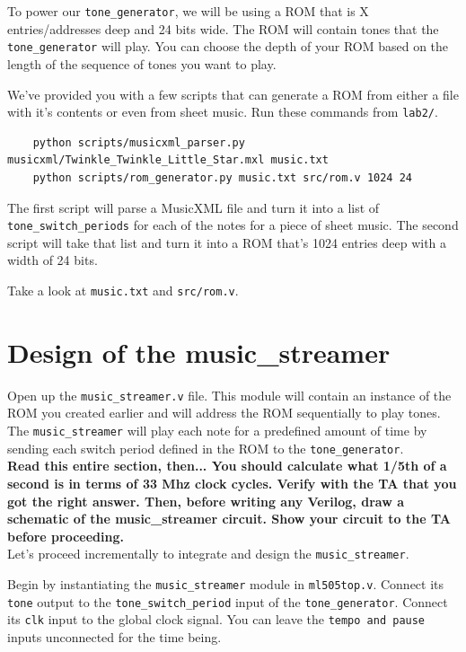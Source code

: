 \documentclass[11pt]{article}
\begin{document}
To power our \verb|tone_generator|, we will be using a ROM that is X entries/addresses deep and 24 bits wide. The ROM will contain tones that the \verb|tone_generator| will play. You can choose the depth of your ROM based on the length of the sequence of tones you want to play.

We've provided you with a few scripts that can generate a ROM from either a file with it's contents or even from sheet music. Run these commands from \verb|lab2/|.

\begin{verbatim}
	python scripts/musicxml_parser.py musicxml/Twinkle_Twinkle_Little_Star.mxl music.txt
	python scripts/rom_generator.py music.txt src/rom.v 1024 24
\end{verbatim}

The first script will parse a MusicXML file and turn it into a list of \verb|tone_switch_periods| for each of the notes for a piece of sheet music. The second script will take that list and turn it into a ROM that's 1024 entries deep with a width of 24 bits.

Take a look at \verb|music.txt| and \verb|src/rom.v|.

\section{Design of the music\_streamer}
Open up the \verb|music_streamer.v| file. This module will contain an instance of the ROM you created earlier and will address the ROM sequentially to play tones. The \verb|music_streamer| will play each note for a predefined amount of time by sending each switch period defined in the ROM to the \verb|tone_generator|.\\

\textbf{Read this entire section, then... You should calculate what 1/5th of a second is in terms of 33 Mhz clock cycles. Verify with the TA that you got the right answer. Then, before writing any Verilog, draw a schematic of the music\_streamer circuit. Show your circuit to the TA before proceeding.}\\

Let's proceed incrementally to integrate and design the \verb|music_streamer|.

Begin by instantiating the \verb|music_streamer| module in \verb|ml505top.v|. Connect its \verb|tone| output to the \verb|tone_switch_period| input of the \verb|tone_generator|. Connect its \verb|clk| input to the global clock signal. You can leave the \verb|tempo and pause| inputs unconnected for the time being.\\
\end{document}
